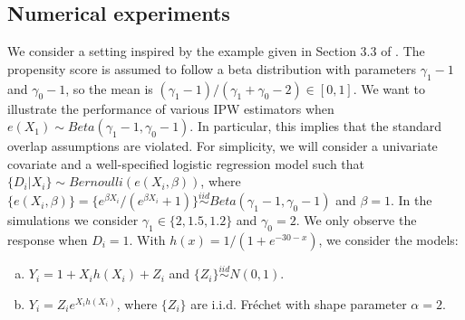 \documentclass[12pt]{amsart}
\newcommand{\1}{\mathbbm{1}}
\newcommand{\0}{\mathbf{0}}
\theoremstyle{plain}
\theoremstyle{definition}
\begin{document}
\subsection{Numerical experiments} \label{sec:numexp}


{ We consider a setting inspired by the example given in Section 3.3 of \cite{crump:hotz:imbens:mitnik2009}. The propensity score is assumed to follow a beta distribution with parameters $\gamma_1-1$  and $\gamma_0-1$, so the mean is $(\gamma_1-1)/(\gamma_1+\gamma_0-2)\in[0,1]$. 
We want to illustrate the performance of various IPW estimators when $e(X_1)\sim Beta(\gamma_1-1,\gamma_0-1)$. In particular, this implies that the standard overlap assumptions are violated. For simplicity, 
we will consider a univariate covariate and a well-specified logistic regression model such that $\{D_i|X_i\}{\sim}Bernoulli(e(X_i,\beta))$, where $\{e(X_i,\beta)\}=\{e^{\beta X_i}/(e^{\beta X_i}+1)\}\overset{iid}{\sim}Beta(\gamma_1-1,\gamma_0-1)$ and $\beta=1$. In the simulations we consider $\gamma_1 \in\{2,1.5, 1.2\}$ and $\gamma_0=2$. 
We only observe the response when $D_i=1$. With $h(x)=1/(1+e^{-30-x})$, we consider the  models:} 
%
\begin{enumerate}[(a)]
        \item $Y_i=1+X_ih(X_i)+Z_i$ and  $\{Z_i\}\overset{iid}{\sim}N(0,1)$.
        \item $Y_i=Z_ie^{X_ih(X_i)}$, where $\{Z_i\}$ are i.i.d. Fr\'echet with shape parameter  $\alpha=2$.  
\end{enumerate}
\end{document}
